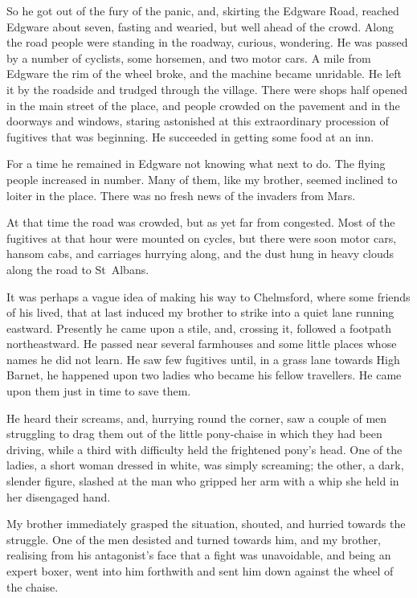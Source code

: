 So he got out of the fury of the panic, and, skirting the Edgware Road, reached Edgware about seven, fasting and wearied, but well ahead of the crowd. Along the road people were standing in the roadway, curious, wondering. He was passed by a number of cyclists, some horsemen, and two motor cars. A mile from Edgware the rim of the wheel broke, and the machine became unridable. He left it by the roadside and trudged through the village. There were shops half opened in the main street of the place, and people crowded on the pavement and in the doorways and windows, staring astonished at this extraordinary procession of fugitives that was beginning. He succeeded in getting some food at an inn.

For a time he remained in Edgware not knowing what next to do. The flying people increased in number. Many of them, like my brother, seemed inclined to loiter in the place. There was no fresh news of the invaders from Mars.

At that time the road was crowded, but as yet far from congested. Most of the fugitives at that hour were mounted on cycles, but there were soon motor cars, hansom cabs, and carriages hurrying along, and the dust hung in heavy clouds along the road to St~Albans.

It was perhaps a vague idea of making his way to Chelmsford, where some friends of his lived, that at last induced my brother to strike into a quiet lane running eastward. Presently he came upon a stile, and, crossing it, followed a footpath northeastward. He passed near several farmhouses and some little places whose names he did not learn. He saw few fugitives until, in a grass lane towards High Barnet, he happened upon two ladies who became his fellow travellers. He came upon them just in time to save them.

He heard their screams, and, hurrying round the corner, saw a couple of men struggling to drag them out of the little pony-chaise in which they had been driving, while a third with difficulty held the frightened pony's head. One of the ladies, a short woman dressed in white, was simply screaming; the other, a dark, slender figure, slashed at the man who gripped her arm with a whip she held in her disengaged hand.

My brother immediately grasped the situation, shouted, and hurried towards the struggle. One of the men desisted and turned towards him, and my brother, realising from his antagonist's face that a fight was unavoidable, and being an expert boxer, went into him forthwith and sent him down against the wheel of the chaise.

